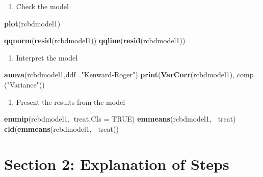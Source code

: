 \documentclass[]{book}
\newenvironment{Shaded}{\begin{snugshade}}{\end{snugshade}}
\newcommand{\KeywordTok}[1]{\textcolor[rgb]{0.13,0.29,0.53}{\textbf{#1}}}
\newcommand{\DataTypeTok}[1]{\textcolor[rgb]{0.13,0.29,0.53}{#1}}
\newcommand{\StringTok}[1]{\textcolor[rgb]{0.31,0.60,0.02}{#1}}
\newcommand{\OtherTok}[1]{\textcolor[rgb]{0.56,0.35,0.01}{#1}}
\newcommand{\OperatorTok}[1]{\textcolor[rgb]{0.81,0.36,0.00}{\textbf{#1}}}
\newcommand{\NormalTok}[1]{#1}
\providecommand{\tightlist}{%
  \setlength{\itemsep}{0pt}\setlength{\parskip}{0pt}}
\theoremstyle{definition}
\theoremstyle{definition}
\theoremstyle{definition}
\theoremstyle{remark}
\begin{document}
\begin{enumerate}
\def\labelenumi{\arabic{enumi}.}
\setcounter{enumi}{5}
\tightlist
\item
  Check the model
\end{enumerate}

\begin{Shaded}
\begin{Highlighting}[]
\KeywordTok{plot}\NormalTok{(rcbdmodel1)}

\KeywordTok{qqnorm}\NormalTok{(}\KeywordTok{resid}\NormalTok{(rcbdmodel1))}
\KeywordTok{qqline}\NormalTok{(}\KeywordTok{resid}\NormalTok{(rcbdmodel1))}
\end{Highlighting}
\end{Shaded}

\begin{enumerate}
\def\labelenumi{\arabic{enumi}.}
\setcounter{enumi}{6}
\tightlist
\item
  Interpret the model
\end{enumerate}

\begin{Shaded}
\begin{Highlighting}[]
\KeywordTok{anova}\NormalTok{(rcbdmodel1,}\DataTypeTok{ddf=}\StringTok{"Kenward-Roger"}\NormalTok{)}
\KeywordTok{print}\NormalTok{(}\KeywordTok{VarCorr}\NormalTok{(rcbdmodel1), }\DataTypeTok{comp=}\NormalTok{(}\StringTok{"Variance"}\NormalTok{))}
\end{Highlighting}
\end{Shaded}

\begin{enumerate}
\def\labelenumi{\arabic{enumi}.}
\setcounter{enumi}{7}
\tightlist
\item
  Present the results from the model
\end{enumerate}

\begin{Shaded}
\begin{Highlighting}[]
\KeywordTok{emmip}\NormalTok{(rcbdmodel1,}\OperatorTok{~}\NormalTok{treat,}\DataTypeTok{CIs =} \OtherTok{TRUE}\NormalTok{)}
\KeywordTok{emmeans}\NormalTok{(rcbdmodel1, }\OperatorTok{~}\NormalTok{treat)}
\KeywordTok{cld}\NormalTok{(}\KeywordTok{emmeans}\NormalTok{(rcbdmodel1, }\OperatorTok{~}\NormalTok{treat))}
\end{Highlighting}
\end{Shaded}

\section{Section 2: Explanation of
Steps}\label{section-2-explanation-of-steps}
\end{document}
